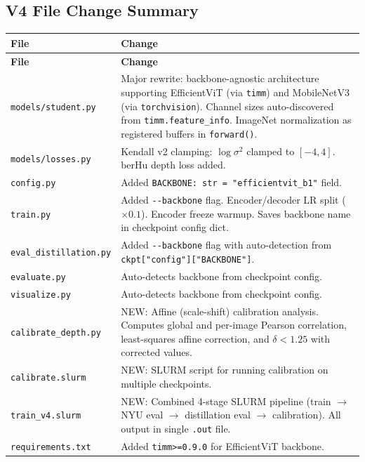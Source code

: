 \documentclass[11pt,a4paper]{article}
\begin{document}
\subsection{V4 File Change Summary}
\label{sec:vivek-files}

\begin{longtable}{lp{8cm}}
\toprule
\textbf{File} & \textbf{Change} \\
\midrule
\endfirsthead
\toprule
\textbf{File} & \textbf{Change} \\
\midrule
\endhead
\texttt{models/student.py}     & Major rewrite: backbone-agnostic architecture supporting EfficientViT (via \texttt{timm}) and MobileNetV3 (via \texttt{torchvision}). Channel sizes auto-discovered from \texttt{timm.feature\_info}. ImageNet normalization as registered buffers in \texttt{forward()}. \\
\texttt{models/losses.py}      & Kendall v2 clamping: $\log \sigma^2$ clamped to $[-4, 4]$. berHu depth loss added. \\
\texttt{config.py}             & Added \texttt{BACKBONE: str = "efficientvit\_b1"} field. \\
\texttt{train.py}              & Added \texttt{-{}-backbone} flag. Encoder/decoder LR split ($\times 0.1$). Encoder freeze warmup. Saves backbone name in checkpoint config dict. \\
\texttt{eval\_distillation.py} & Added \texttt{-{}-backbone} flag with auto-detection from \texttt{ckpt["config"]["BACKBONE"]}. \\
\texttt{evaluate.py}           & Auto-detects backbone from checkpoint config. \\
\texttt{visualize.py}          & Auto-detects backbone from checkpoint config. \\
\texttt{calibrate\_depth.py}   & NEW: Affine (scale-shift) calibration analysis. Computes global and per-image Pearson correlation, least-squares affine correction, and $\delta < 1.25$ with corrected values. \\
\texttt{calibrate.slurm}       & NEW: SLURM script for running calibration on multiple checkpoints. \\
\texttt{train\_v4.slurm}       & NEW: Combined 4-stage SLURM pipeline (train $\to$ NYU eval $\to$ distillation eval $\to$ calibration). All output in single \texttt{.out} file. \\
\texttt{requirements.txt}      & Added \texttt{timm>=0.9.0} for EfficientViT backbone. \\
\bottomrule
\end{longtable}
\end{document}

